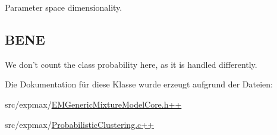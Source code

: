 Parameter space dimensionality. 

\hypertarget{classCDA_1_1GaussianMixtureModel_NOTA}{}\subsection{BENE}\label{classCDA_1_1GaussianMixtureModel_NOTA}
We don't count the class probability here, as it is handled differently. 

Die Dokumentation für diese Klasse wurde erzeugt aufgrund der Dateien:\begin{DoxyCompactItemize}
\item 
src/expmax/\hyperlink{EMGenericMixtureModelCore_8h_09_09}{EMGenericMixtureModelCore.h++}\item 
src/expmax/\hyperlink{ProbabilisticClustering_8c_09_09}{ProbabilisticClustering.c++}\end{DoxyCompactItemize}
